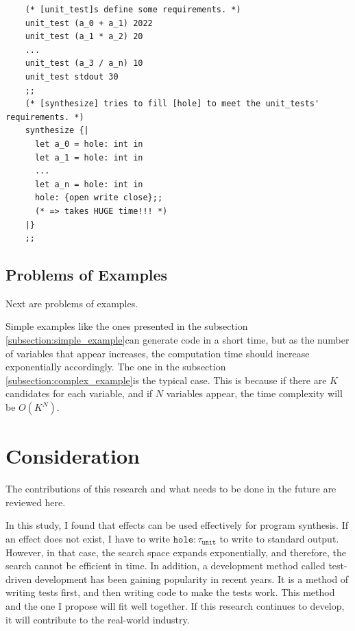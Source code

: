 \documentclass[12pt, a4paper, titlepage]{report}
\begin{document}
  \begin{verbatim}
    (* [unit_test]s define some requirements. *)
    unit_test (a_0 + a_1) 2022
    unit_test (a_1 * a_2) 20
    ...
    unit_test (a_3 / a_n) 10
    unit_test stdout 30
    ;;
    (* [synthesize] tries to fill [hole] to meet the unit_tests' requirements. *)
    synthesize {|
      let a_0 = hole: int in
      let a_1 = hole: int in
      ...
      let a_n = hole: int in
      hole: {open write close};;
      (* => takes HUGE time!!! *)
    |}
    ;;
  \end{verbatim}

  \subsection{Problems of Examples}
  Next are problems of examples.

  Simple examples like the ones presented in the subsection \ref{subsection:simple_example}can generate code in a short time, but as the number of variables that appear increases, the computation time should increase exponentially accordingly.
  The one in the subsection \ref{subsection:complex_example}is the typical case.
  This is because if there are $K$ candidates for each variable, and if $N$ variables appear, the time complexity will be $O(K^N)$.

  \section{Consideration}
  The contributions of this research and what needs to be done in the future are reviewed here.

  In this study, I found that effects can be used effectively for program synthesis.
  If an effect does not exist, I have to write $\mathtt{hole: \tau_{unit}}$ to write to standard output.
  However, in that case, the search space expands exponentially, and therefore, the search cannot be efficient in time.
  In addition, a development method called test-driven development has been gaining popularity in recent years.
  It is a method of writing tests first, and then writing code to make the tests work.
  This method and the one I propose will fit well together.
  If this research continues to develop, it will contribute to the real-world industry.
\end{document}
